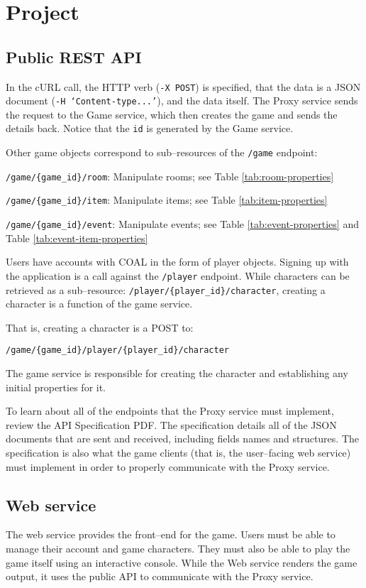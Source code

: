 \documentclass{article}
\newcommand{\enterProblemHeader}[1]{
}
\newcommand{\exitProblemHeader}[1]{
\nobreak\extramarks{#1}{}\nobreak
}
\newcounter{homeworkProblemCounter} %
\newcommand{\homeworkProblemName}{}
\newenvironment{homeworkProblem}[1][Problem \arabic{homeworkProblemCounter}]{ %
\stepcounter{homeworkProblemCounter} %
\renewcommand{\homeworkProblemName}{#1} %
\section{\homeworkProblemName} %
\enterProblemHeader{\homeworkProblemName} %
}{
\exitProblemHeader{\homeworkProblemName} %
}
\newcommand{\homeworkSectionName}{}
\newenvironment{homeworkSection}[1]{ %
\renewcommand{\homeworkSectionName}{#1} %
\subsection{\homeworkSectionName} %
\enterProblemHeader{\homeworkProblemName\ [\homeworkSectionName]} %
}{
\enterProblemHeader{\homeworkProblemName} %
}
\begin{document}
\begin{homeworkProblem}[Project]
\begin{homeworkSection}{Public REST API}
	In the cURL call, the HTTP verb (\texttt{-X POST}) is specified, that the data is a JSON document (\texttt{-H `Content-type...'}), and the data itself. The Proxy service sends the request to the Game service, which then creates the game and sends the details back. Notice that the \texttt{id} is generated by the Game service.

	Other game objects correspond to sub--resources of the \texttt{/game} endpoint:
	\begin{compactitem}
		\item \texttt{/game/\{game\_id\}/room}: Manipulate rooms; see Table \ref{tab:room-properties}
		\item \texttt{/game/\{game\_id\}/item}: Manipulate items; see Table \ref{tab:item-properties}
		\item \texttt{/game/\{game\_id\}/event}: Manipulate events; see Table \ref{tab:event-properties} and Table \ref{tab:event-item-properties}
	\end{compactitem}
	
	Users have accounts with COAL in the form of player objects. Signing up with the application is a call against the \texttt{/player} endpoint. While characters can be retrieved as a sub--resource: \texttt{/player/\{player\_id\}/character}, creating a character is a function of the game service. 
	
	That is, creating a character is a POST to:
	 
	\texttt{/game/\{game\_id\}/player/\{player\_id\}/character} 
	
	The game service is responsible for creating the character and establishing any initial properties for it.

	To learn about all of the endpoints that the Proxy service must implement, review the API Specification PDF. The specification details all of the JSON documents that are sent and received, including fields names and structures. The specification is also what the game clients (that is, the user--facing web service) must implement in order to properly communicate with the Proxy service.
\end{homeworkSection}


\begin{homeworkSection}{Web service}
	The web service provides the front--end for the game. Users must be able to manage their account and game characters. They must also be able to play the game itself using an interactive console. While the Web service renders the game output, it uses the public API to communicate with the Proxy service.
\end{homeworkSection}



\end{homeworkProblem}
\end{document}
